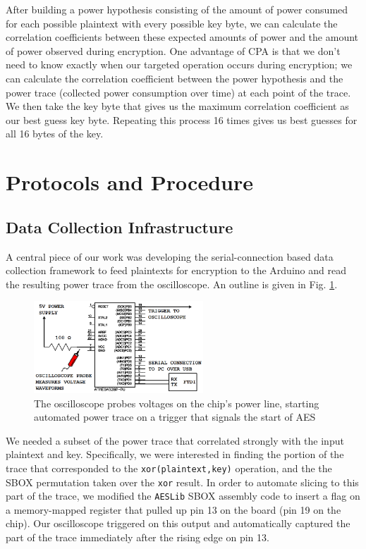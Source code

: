 \documentclass[journal]{ieee_style}
\begin{document}
After building a power hypothesis consisting of the amount of power consumed for each possible plaintext with every possible key byte, we can calculate the correlation coefficients between these expected amounts of power and the amount of power observed during encryption. One advantage of CPA is that we don't need to know exactly when our targeted operation occurs during encryption; we can calculate the correlation coefficient between the power hypothesis and the power trace (collected power consumption over time) at each point of the trace. We then take the key byte that gives us the maximum correlation coefficient as our best guess key byte. Repeating this process 16 times gives us best guesses for all 16 bytes of the key.


\section{Protocols and Procedure}
\subsection{Data Collection Infrastructure}
A central piece of our work was developing the serial-connection based data collection framework to feed plaintexts for encryption to the Arduino and read the resulting power trace from the oscilloscope. An outline is given in Fig. \ref{fig_sim}.

\begin{figure}[ht]
\centering
\includegraphics[width=2.5in]{setup}
\caption{The oscilloscope probes voltages on the chip's power line, starting automated power trace on a trigger that signals the start of AES}
\label{fig_sim}
\end{figure}

We needed a subset of the power trace that correlated strongly with the input plaintext and key. Specifically, we were interested in finding the portion of the trace that corresponded to the \texttt{xor(plaintext,key)} operation, and the the SBOX permutation taken over the \texttt{xor} result. In order to automate slicing to this part of the trace, we modified the \texttt{AESLib} SBOX assembly code to insert a flag on a memory-mapped register that pulled up pin 13 on the board (pin 19 on the chip). Our oscilloscope triggered on this output and automatically captured the part of the trace immediately after the rising edge on pin 13.
\end{document}
